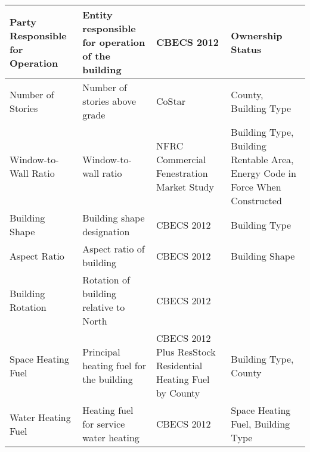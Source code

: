 \begin{center}
\begin{longtable}{|p{1.3in}|p{1.5in}|p{1.5in}|p{1.5in}|}
Party Responsible for Operation                                 & Entity responsible for operation of the building                               & CBECS 2012                                                  & Ownership Status                                                                                     \\ \hline
Number of Stories                                               & Number of stories above grade                                                  & CoStar                                                      & County, Building Type                                                                                \\ \hline
Window-to-Wall Ratio                                            & Window-to-wall ratio                                                           & NFRC Commercial Fenestration Market Study                   & Building Type, Building Rentable Area, Energy Code in Force When Constructed                         \\ \hline
Building Shape                                                  & Building shape designation                                                     & CBECS 2012                                                  & Building Type                                                                                        \\ \hline
Aspect Ratio                                                    & Aspect ratio of building                                                       & CBECS 2012                                                  & Building Shape                                                                                       \\ \hline
Building Rotation                                               & Rotation of building relative to North                                         & CBECS 2012                                                  &                                                                                                      \\ \hline
Space Heating Fuel                                              & Principal heating fuel for the building                                        & CBECS 2012 Plus ResStock Residential Heating Fuel by County & Building Type, County                                                                                \\ \hline
Water Heating Fuel                                              & Heating fuel for service water heating                                         & CBECS 2012~                                                 & Space Heating Fuel, Building Type                                                                    \\ \hline

\end{longtable}
\end{center}
